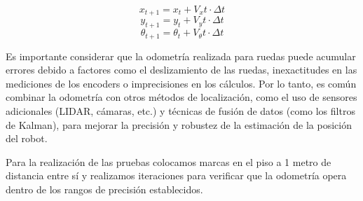 $$ x_{t+1} = x_t + V_xt \cdot \Delta t $$
$$ y_{t+1} = y_t + V_yt \cdot \Delta t $$
$$ \theta_{t+1} = \theta_t + V_\theta t \cdot \Delta t $$

Es importante considerar que la odometría realizada para ruedas puede acumular errores debido a factores como el deslizamiento de las ruedas, inexactitudes en las mediciones de los encoders o imprecisiones en los cálculos. Por lo tanto, es común combinar la odometría con otros métodos de localización, como el uso de sensores adicionales (LIDAR, cámaras, etc.) y técnicas de fusión de datos (como los filtros de Kalman), para mejorar la precisión y robustez de la estimación de la posición del robot.

Para la realización de las pruebas colocamos marcas en el piso a 1 metro de distancia entre sí y realizamos iteraciones para verificar que la odometría opera dentro de los rangos de precisión establecidos.

